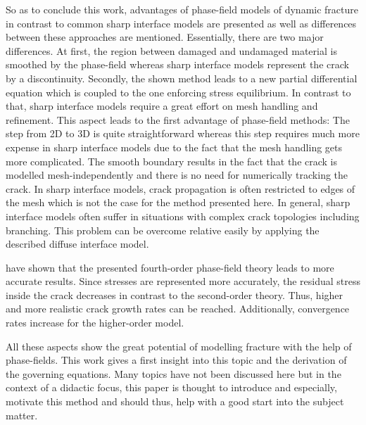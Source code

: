 So as to conclude this work, advantages of phase-field models of dynamic fracture in contrast to common sharp interface models are presented as well as differences between these approaches are mentioned. Essentially, there are two major differences. At first, the region between damaged and undamaged material is smoothed by the phase-field whereas sharp interface models represent the crack by a discontinuity. Secondly, the shown method leads to a new partial differential equation which is coupled to the one enforcing stress equilibrium. In contrast to that, sharp interface models require a great effort on mesh handling and refinement. This aspect leads to the first advantage of phase-field methods: The step from 2D to 3D is quite straightforward whereas this step requires much more expense in sharp interface models due to the fact that the mesh handling gets more complicated. The smooth boundary results in the fact that the crack is modelled mesh-independently and there is no need for numerically tracking the crack. In sharp interface models, crack propagation is often restricted to edges of the mesh which is not the case for the method presented here. In general, sharp interface models often suffer in situations with complex crack topologies including branching. This problem can be overcome relative easily by applying the described diffuse interface model.

\citet{02_PF_HO_brittle} have shown that the presented fourth-order phase-field theory leads to more accurate results. Since stresses are represented more accurately, the residual stress inside the crack decreases in contrast to the second-order theory. Thus, higher and more realistic crack growth rates can be reached. Additionally, convergence rates increase for the higher-order model.

All these aspects show the great potential of modelling fracture with the help of phase-fields. This work gives a first insight into this topic and the derivation of the governing equations. Many topics have not been discussed here but in the context of a didactic focus, this paper is thought to introduce and especially, motivate this method and should thus, help with a good start into the subject matter.


